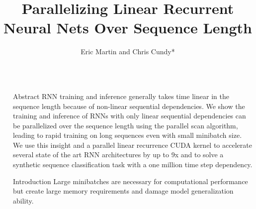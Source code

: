 \documentclass[final]{beamer}
\title{Parallelizing Linear Recurrent Neural Nets Over Sequence Length} %
\author{Eric Martin and Chris Cundy*} %
\institute{*UC Berkeley} %
\newlength{\sepwid}
\newlength{\onecolwid}
\begin{document}

\setlength{\belowcaptionskip}{2ex} %
\setlength\belowdisplayshortskip{2ex} %

\begin{frame}[t] %

\begin{columns}[t] %

\begin{column}{\sepwid}\end{column} %

\begin{column}{\onecolwid} %


\begin{alertblock}{Abstract}
RNN training and inference generally takes time linear in the sequence length because
of non-linear sequential dependencies.
We show the training and inference of RNNs with only linear
sequential dependencies can be parallelized over the sequence length using the
parallel scan algorithm, leading to rapid training on long sequences even with
small minibatch size. We use this insight and a parallel linear recurrence CUDA
kernel to accelerate several state of the art RNN architectures by up to 9x and
to solve a synthetic sequence classification task with a one million time step
dependency.
\end{alertblock}

\begin{block}{Introduction}
Large minibatches are necessary for computational performance but create large memory
requirements and damage model generalization ability.


\end{block}
\end{column}
\end{columns}
\end{frame}
\end{document}
